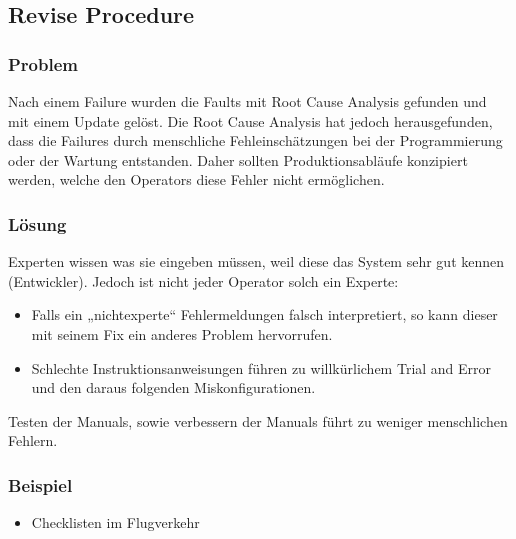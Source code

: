 \subsection{Revise Procedure}


\subsubsection*{Problem}


Nach einem Failure wurden die Faults mit Root Cause Analysis gefunden und mit einem Update gelöst. Die Root Cause Analysis hat jedoch herausgefunden, dass die Failures durch menschliche Fehleinschätzungen bei der Programmierung oder der Wartung entstanden. Daher sollten Produktionsabläufe konzipiert werden, welche den Operators diese Fehler nicht ermöglichen.

\subsubsection*{Lösung}


Experten wissen was sie eingeben müssen, weil diese das System sehr gut kennen (Entwickler). Jedoch ist nicht jeder Operator solch ein Experte:
\begin{itemize}
	\item Falls ein „nichtexperte“ Fehlermeldungen falsch interpretiert, so kann dieser mit seinem Fix ein anderes Problem hervorrufen.
	\item Schlechte Instruktionsanweisungen führen zu willkürlichem Trial and Error und den daraus folgenden Miskonfigurationen.
\end{itemize}

Testen der Manuals, sowie verbessern der Manuals führt zu weniger menschlichen Fehlern.


\subsubsection*{Beispiel}

\begin{itemize}
	\item Checklisten im Flugverkehr
\end{itemize}

